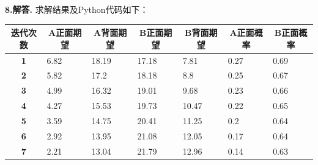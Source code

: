 \documentclass[12pt, a4paper, oneside]{ctexart}
\newenvironment{solution}[1][]{\par\noindent\textbf{#1解答. }}{\smallskip\par}  %
\begin{document}
\begin{solution}[8.]
求解结果及Python代码如下：
\begin{table}[htbp]
    \centering
\begin{tabular}{cllllll}
        \toprule
\textbf{迭代次数} & \multicolumn{1}{c}{\textbf{A正面期望}} & \multicolumn{1}{c}{\textbf{A背面期望}} & \multicolumn{1}{c}{\textbf{B正面期望}} & \multicolumn{1}{c}{\textbf{B背面期望}} & \multicolumn{1}{c}{\textbf{A正面概率}} & \multicolumn{1}{c}{\textbf{B正面概率}} \\
        \midrule
\textbf{1}    & 6.82                               & 18.19                              & 17.18                              & 7.81                               & 0.27                               & 0.69                               \\
        \midrule
\textbf{2}    & 5.82                               & 17.2                               & 18.18                              & 8.8                                & 0.25                               & 0.67                               \\
        \midrule
\textbf{3}    & 4.99                               & 16.32                              & 19.01                              & 9.68                               & 0.23                               & 0.66                               \\
        \midrule
\textbf{4}    & 4.27                               & 15.53                              & 19.73                              & 10.47                              & 0.22                               & 0.65                               \\
        \midrule
\textbf{5}    & 3.59                               & 14.75                              & 20.41                              & 11.25                              & 0.2                                & 0.64                               \\
        \midrule
\textbf{6}    & 2.92                               & 13.95                              & 21.08                              & 12.05                              & 0.17                               & 0.64                               \\
        \midrule
\textbf{7}    & 2.21                               & 13.04                              & 21.79                              & 12.96                              & 0.14                               & 0.63                               \\

\end{tabular}
\end{table}
\end{solution}
\end{document}
